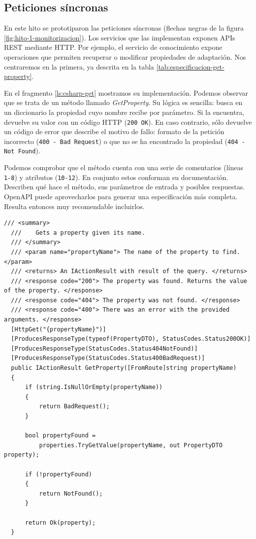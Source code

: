 \subsection{Peticiones síncronas}

En este hito se prototiparon las peticiones síncronas (flechas negras de la figura \ref{fig:hito-1-monitorizacion}). Los servicios que las implementan exponen APIs REST mediante  HTTP. Por ejemplo, el servicio de conocimiento expone operaciones que permiten recuperar o modificar propiedades de adaptación. Nos centraremos en la primera, ya descrita en la tabla \ref{tab:especificacion-get-property}.

En el fragmento \ref{ls:csharp-get} mostramos su implementación. Podemos observar que se trata de un método llamado \emph{GetProperty}. Su lógica es sencilla: busca en un diccionario la propiedad cuyo nombre recibe por parámetro. Si la encuentra, devuelve su valor con un código HTTP (\texttt{200 OK}). En caso contrario, sólo devuelve un código de error que describe el motivo de fallo: formato de la petición incorrecto (\texttt{400 - Bad Request}) o que no se ha encontrado la propiedad (\texttt{404 - Not Found}).

Podemos comprobar que el método cuenta con una serie de comentarios (líneas \texttt{1-8}) y atributos (\texttt{10-12}). En conjunto estos conforman su documentación. Describen qué hace el método, sus parámetros de entrada y posibles respuestas. OpenAPI puede aprovecharlos para generar una especificación más completa. Resulta entonces muy recomendable incluirlos.

\begin{lstlisting}[language={[Sharp]C},caption={Implementación del método GetProperty decorado para generar la especificación OpenAPI.},captionpos=b, label=ls:csharp-get]
  /// <summary>
  ///    Gets a property given its name.
  /// </summary>
  /// <param name="propertyName"> The name of the property to find. </param>
  /// <returns> An IActionResult with result of the query. </returns>
  /// <response code="200"> The property was found. Returns the value of the property. </response>
  /// <response code="404"> The property was not found. </response>
  /// <response code="400"> There was an error with the provided arguments. </response>
  [HttpGet("{propertyName}")]
  [ProducesResponseType(typeof(PropertyDTO), StatusCodes.Status200OK)]
  [ProducesResponseType(StatusCodes.Status404NotFound)]
  [ProducesResponseType(StatusCodes.Status400BadRequest)]
  public IActionResult GetProperty([FromRoute]string propertyName)
  {
      if (string.IsNullOrEmpty(propertyName))
      {
          return BadRequest();
      }

      bool propertyFound =
          properties.TryGetValue(propertyName, out PropertyDTO property);

      if (!propertyFound)
      {
          return NotFound();
      }

      return Ok(property);
  }
\end{lstlisting}

